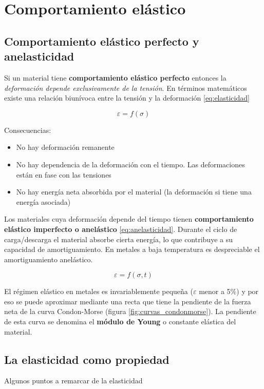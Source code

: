 \section{Comportamiento elástico}

\subsection{Comportamiento elástico perfecto y anelasticidad}
Si un material tiene \textbf{comportamiento elástico perfecto} entonces la \textit{deformación depende exclusivamente de la tensión}. En términos matemáticos existe una relación biunívoca entre la tensión y la deformación \eqref{eq:elasticidad}

\begin{equation} \label{eq:elasticidad}
	\varepsilon = f(\sigma)
\end{equation}

Consecuencias:
\begin{itemize}
	\item No hay deformación remanente
	\item No hay dependencia de la deformación con el tiempo. Las deformaciones están en fase con las tensiones
	\item No hay energía neta absorbida por el material (la deformación si tiene una energía asociada)
\end{itemize}


Los materiales cuya deformación depende del tiempo tienen \textbf{comportamiento elástico imperfecto o anelástico} \eqref{eq:anelasticidad}. Durante el ciclo de carga/descarga el material absorbe cierta energía, lo que contribuye a su capacidad de amortiguamiento. En metales a baja temperatura es despreciable el amortiguamiento anelástico.

\begin{equation} \label{eq:anelasticidad}
	\varepsilon = f(\sigma,t)
\end{equation}

El régimen elástico en metales es invariablemente pequeña ($\varepsilon$ menor a 5\%) y por eso se puede aproximar mediante una recta que tiene la pendiente de la fuerza neta de la curva Condon-Morse (figura \ref{fig:curvas_condonmorse}). La pendiente de esta curva se denomina el \textbf{módulo de Young} o constante elástica del material.

\subsection{La elasticidad como propiedad}
Algunos puntos a remarcar de la elasticidad

